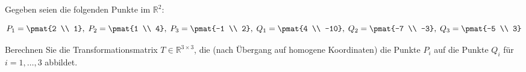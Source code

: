 %
Gegeben seien die folgenden Punkte im $ℝ^2$:

\[
P_1 = \pmat{2 \\ 1} ,\;
P_2 = \pmat{1 \\ 4} ,\;
P_3 = \pmat{-1 \\ 2} ,\;
Q_1 = \pmat{4 \\ -10} ,\;
Q_2 = \pmat{-7 \\ -3} ,\;
Q_3 = \pmat{-5 \\ 3}
\]

Berechnen Sie die Transformationsmatrix $T \in ℝ^{3\times 3}$, die 
(nach Übergang auf homogene Koordinaten) die Punkte $P_i$ auf die Punkte 
$Q_i$ für $i = 1, \dots, 3$ abbildet.

